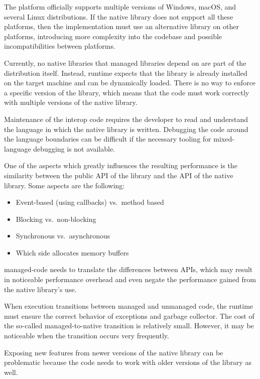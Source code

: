 \begin{itemize}

     The \dotnet{} platform officially supports
multiple versions of Windows, macOS, and several Linux distributions. If the native library does not
support all these platforms, then the implementation must use an alternative library on other
platforms, introducing more complexity into the codebase and possible incompatibilities between
platforms.

     Currently, no native libraries that managed
\dotnet{} libraries depend on are part of the \dotnet{} distribution itself. Instead, \dotnet{}
runtime expects that the library is already installed on the target machine and can be dynamically
loaded. There is no way to enforce a specific version of the library, which means that the \dotnet{}
code must work correctly with multiple versions of the native library.

     Maintenance of the interop code requires the developer to read and
understand the language in which the native library is written. Debugging the code around the
language boundaries can be difficult if the necessary tooling for mixed-language debugging is not
available.

     One of the aspects which greatly influences the resulting performance is
the similarity between the public API of the \dotnet{} library and the API of the native library.
Some aspects are the following:

    \begin{itemize}
      \item Event-based (using callbacks) vs.\ method based
      \item Blocking vs.\ non-blocking
      \item Synchronous vs.\ asynchronous
      \item Which side allocates memory buffers
    \end{itemize}

    \Gls{managed-code} needs to translate the differences between APIs, which may result in
noticeable performance overhead and even negate the performance gained from the native library's
use.

     When execution transitions between managed and unmanaged code,
the runtime must ensure the correct behavior of exceptions and garbage collector. The cost of the
so-called managed-to-native transition is relatively small. However, it may be noticeable when the
transition occurs very frequently.

     Exposing new features from newer versions of the native library can
be problematic because the code needs to work with older versions of the library as well.

\end{itemize}

